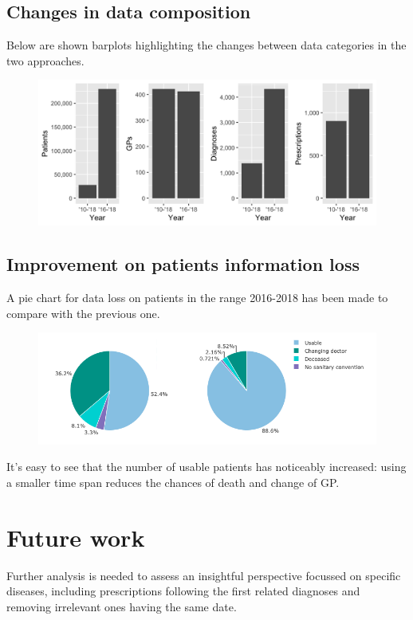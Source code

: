 \subsection{Changes in data composition}
Below are shown barplots highlighting the changes between data categories in the two approaches.
\begin{figure}[h]
	\centering
	\includegraphics[scale=0.33]{../plots/pj-barplots.png}
\end{figure}

\subsection{Improvement on patients information loss}
A pie chart for data loss on patients in the range 2016-2018 has been made to compare with the previous one.

\begin{figure}[h]
	\centering
	\includegraphics[scale=0.6]{images/patients-pies.png}
\end{figure}

It's easy to see that the number of usable patients has noticeably increased: using a smaller time span reduces the chances of death and change of GP.

\section{Future work}
Further analysis is needed to assess an insightful perspective focussed on specific diseases, including prescriptions following the first related diagnoses and removing irrelevant ones having the same date.

